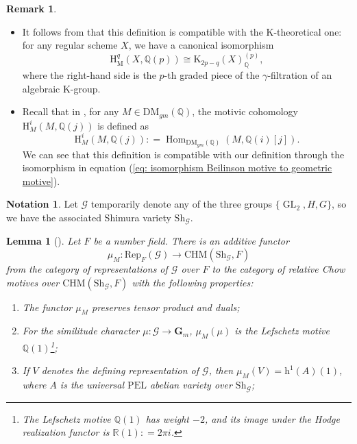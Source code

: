 \documentclass[11pt, a4paper]{amsart}
\theoremstyle{plain}
\newtheorem{lemma}[theorem]{Lemma}
\theoremstyle{definition}
\newtheorem{remark}[theorem]{Remark}
\newtheorem{notation}[theorem]{Notation}
\numberwithin{equation}{section}
\def\calG{\mathcal{G}}
\def\QQ{\mathbb{Q}}
\def\RR{\mathbb{R}}
\DeclareMathOperator{\Hom}{Hom}
\DeclareMathOperator{\GL}{\mathrm{GL}}
\newcommand{\Sh}{\mathrm{Sh}}
\newcommand{\K}{\mathrm{K}}
\begin{document}
 \begin{remark}
    \begin{itemize}
        \item It follows from \cite[Corrollary 14.2.14]{Cisinski_Deglise} that this definition is compatible with the K-theoretical one: 
         for any regular scheme $X$, we have a canonical isomorphism
         \[
                \mathrm{H}_{\mathrm{M}}^{q}(X, \QQ(p)) \cong \mathrm{K}_{2p-q}(X)_{\QQ}^{(p)},
         \]
         where the right-hand side is the $p$-th graded piece of the $\gamma$-filtration of an algebraic $\K$-group.
         \item Recall that in \cite[Page 21]{Wild_09}, for any $M \in \mathrm{DM}_{gm}(\QQ)$, the motivic cohomology $\mathrm{H}_{M}^{i}(M, \QQ(j))$ is defined as 
         \begin{equation}
         \label{eq: def of motivic cohomology of motives}
             \mathrm{H}_{M}^{i}(M, \QQ(j)): = \Hom_{\mathrm{DM}_{gm}(\QQ)}(M, \QQ(i)[j]). 
         \end{equation}
         We can see that this definition is compatible with our definition through the isomorphism in equation (\ref{eq: isomorphism Beilinson motive to geometric motive}). 
    \end{itemize}
 \end{remark}
 

\begin{notation}
Let $\mathcal{G}$ temporarily denote any of the three groups $\{\GL_2, H, G \}$, so we have the associated Shimura variety $\Sh_{\calG}$. 
\end{notation}

\begin{lemma}[{\cite[Theorem 8.6]{Ancona15}}]
\label{lemma: Ancona}
Let $F$ be a number field. There is an additive functor 
\[
    \mu_{M} \colon \mathrm{Rep}_{F}(\calG) \rightarrow \mathrm{CHM}(\Sh_{\calG}, F)
\]
from the category of representations of $\calG$ over $F$ to the category of relative Chow motives over $\mathrm{CHM}(\Sh_{\calG}, F)$ with the following properties: 
\begin{enumerate}
\item The functor $\mu_{M}$ preserves tensor product and duals;
\item For the similitude character $\mu \colon \calG \rightarrow \mathbf{G}_{m}$, $\mu_{M}(\mu)$ is the Lefschetz motive 
$\QQ(1)$\footnote{The Lefschetz motive $\QQ(1)$ has weight $-2$, and its image under the Hodge realization functor is $\RR(1): = 2\pi i$. };
\item If $V$ denotes the defining representation of $\mathcal{G}$, then $\mu_{M}(V) = \mathrm{h}^{1}(A)(1)$, where $A$ is the universal $\mathrm{PEL}$ abelian variety over $\Sh_{\mathcal{G}}$;
   
\end{enumerate}
\end{lemma}
\end{document}
